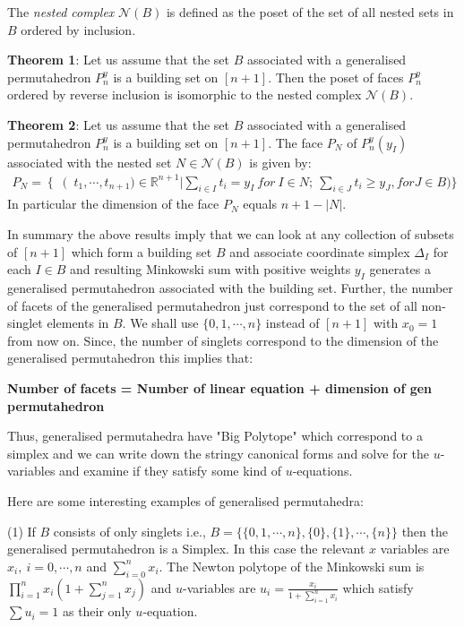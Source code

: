\documentclass[hidelinks,12pt]{article}
\newcommand{\bea}[1]{\begin{eqnarray}\label{#1} }
\newcommand{\eea}{\end{eqnarray}}
\def\bea{\begin{eqnarray}}
\def\eea{\end{eqnarray}}
\begin{document}
The {\it nested complex} $\mathcal{N}(B)$ is defined as the poset of the set of all nested sets in $B$ ordered by inclusion.

{\bf Theorem 1}: Let us assume that the set $B$ associated with a generalised permutahedron $P_n^{y}$ is a building set on $[n+1]$. Then the poset of faces $P_n^{y}$ ordered by reverse inclusion is isomorphic to the nested complex $\mathcal{N}(B)$. 

{\bf Theorem 2}: Let us assume that the set $B$ associated with a generalised permutahedron $P_n^{y}$ is a building set on $[n+1]$. The face $P_N$ of $P_n^{y}(y_I)$ associated with the nested set $N \in \mathcal{N}(B)$ is given by:
\bea
P_N = \left \{ \right (t_1,\cdots,t_{n+1}) \in \mathbb{R}^{n+1} | \sum_{i \in I} t_i =y_{I}~for~I \in N; ~ \sum_{i \in J}t_i \geq y_J, for J \in B  )\}
\eea
In particular the dimension of the face $P_N$ equals $n+1-|N|$. 

In summary the above results imply that we can look at any collection of subsets of $[n+1]$ which form a building set $B$ and associate  coordinate simplex $\Delta_I$ for each $I \in B$ and resulting Minkowski sum with positive weights $y_I$ generates a generalised permutahedron associated with the building set. Further, the number of facets of the generalised permutahedron just correspond to the set of all non-singlet elements in $B$.  
We shall use $ \{0,1,\cdots,n \}$ instead of $[n+1]$ with $x_0 =1$ from now on. Since, the number of singlets correspond to the dimension of the generalised permutahedron this implies that:

{\bf Number of facets = Number of linear equation + dimension of  gen permutahedron}
 
Thus, generalised permutahedra have "Big Polytope" which correspond to a simplex and we can write down the stringy canonical forms and solve for the $u$-variables and examine if they satisfy some kind of $u$-equations.

Here are some interesting examples of generalised permutahedra:

(1) If $B$ consists of only singlets i.e., $B=\{ \{ 0,1,\cdots,n \}, \{ 0 \},\{ 1 \},\cdots ,\{ n \} \}$ then the generalised permutahedron is a Simplex. In this case the relevant $x$ variables are $x_i,~ i=0,\cdots,n$ and $\sum_{i=0}^n x_i$. 
The Newton polytope of the Minkowski sum is $\prod_{i=1}^{n} x_i (1+\sum_{j=1}^{n} x_j)$ and $u$-variables are 
$u_i =\frac{ x_i}{1+\sum_{i=1}^n x_i} $
which satisfy $\sum u_i =1$ as their only $u$-equation. \\
\end{document}
